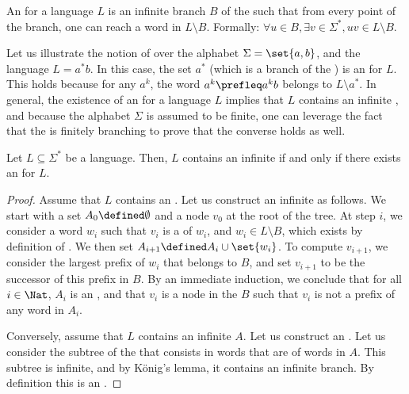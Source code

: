 \begin{definition}
    An  for a language $L$ is an infinite 
    branch $B$ of the  such that from every point of the branch, 
    one can reach a word in $L \setminus B$. Formally:
    $\forall u \in B, \exists v \in \Sigma^*, uv \in L \setminus B$.
\end{definition}

Let us illustrate the notion of  over the alphabet $\Sigma
= \set{a,b}$, and the language $L = a^* b$. In this case, the set $a^*$ (which
is a branch of the ) is an  for $L$.
This holds because for any $a^k$, the word $a^k \prefleq a^kb$ belongs to $L
\setminus a^*$. In general, the existence of an  for a
language $L$ implies that $L$ contains an infinite , and because
the alphabet $\Sigma$ is assumed to be finite, one can leverage the fact that
the  is finitely branching to prove that the converse
holds as well.

\begin{lemma}
    \label{antichain-branches-prefix:lem}
    Let $L \subseteq \Sigma^*$ be a language. Then, $L$ contains an infinite
     if and only if there exists an  for $L$.
\end{lemma}
\begin{proof}
    Assume that $L$ contains an . Let us construct an
    infinite  as follows. We start with a set $A_0 \defined
    \emptyset$ and a node $v_0$ at the root of the tree. At step $i$, we
    consider a word $w_i$ such that $v_i$ is a  of $w_i$, and $w_i
    \in L \setminus B$, which exists by definition of .
    We then set $A_{i+1} \defined A_i \cup \set{w_i}$. To compute $v_{i+1}$, we
    consider the largest prefix of $w_i$ that belongs to $B$, and set $v_{i+1}$
    to be the successor of this prefix in $B$. By an immediate induction, we
    conclude that for all $i \in \Nat$, $A_i$ is an , and that
    $v_i$ is a node in the  $B$ such that $v_i$ is not a
    prefix of any word in $A_i$. 

    Conversely, assume that $L$ contains an infinite  $A$. Let us
    construct an . Let us consider the subtree of the
     that consists in words that are  of
    words in $A$. This subtree is infinite, and by König's lemma, it contains
    an infinite branch. By definition this is an .
\end{proof}

